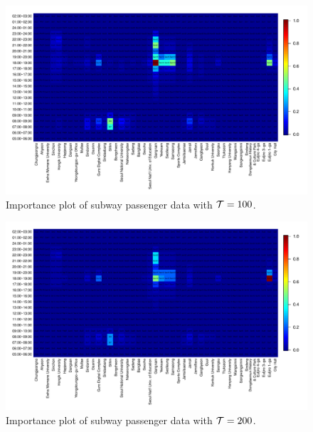 \documentclass[preprint, review, 12pt]{article}
\theoremstyle{definition}
\theoremstyle{remark}
\begin{document}
\begin{figure}
	\centering
	\includegraphics[width=1.05\textwidth]{Fig/In_scale_2.pdf}
	\vspace{-13mm}
	\caption{Importance plot of subway passenger data with ${\cal T}=100$.}
	\label{snow:subway_in_1}
\end{figure}

\begin{figure}
	\centering
	\includegraphics[width=1.05\textwidth]{Fig/In_scale_3.pdf}
	\vspace{-13mm}
	\caption{Importance plot of subway passenger data with ${\cal T}=200$.}
	\label{snow:subway_in_2}
\end{figure}
\end{document}
